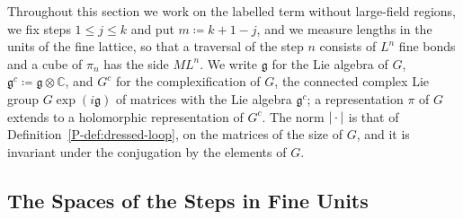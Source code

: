 Throughout this section we work on the labelled term without large-field regions, we fix steps $1 \leq j \leq k$ and put $m \coloneqq k + 1 - j$, and we measure lengths in the units of the fine lattice, so that a traversal of the step $n$ consists of $L^n$ fine bonds and a cube of $\pi_n$ has the side $ML^n$. We write $\mathfrak g$ for the Lie algebra of $G$, $\mathfrak g^c \coloneqq \mathfrak g \otimes \mathbb C$, and $G^c$ for the complexification of $G$, the connected complex Lie group $G\exp(i\mathfrak g)$ of matrices with the Lie algebra $\mathfrak g^c$; a representation $\pi$ of $G$ extends to a holomorphic representation of $G^c$. The norm $\lvert\,\cdot\,\rvert$ is that of Definition~\ref{P-def:dressed-loop}, on the matrices of the size of $G$, and it is invariant under the conjugation by the elements of $G$.

\subsection{The Spaces of the Steps in Fine Units}\label{sec:spaces-fine-units}


